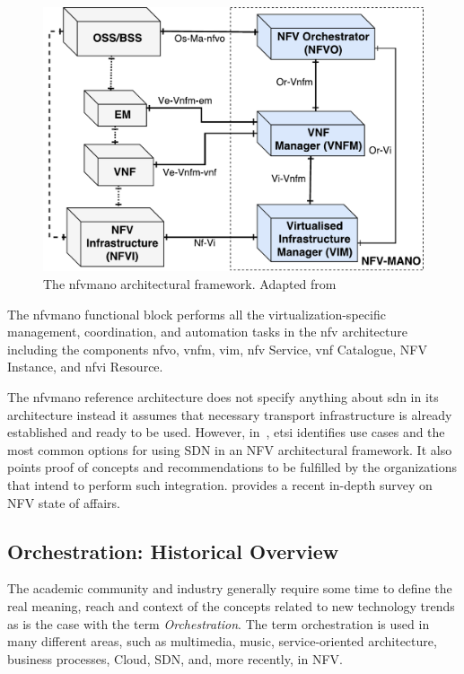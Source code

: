 \begin{figure}[t]
  \centering
  \includegraphics[scale=.4]{Figures/02_Background/MANO}
    \caption{The \gls{nfvmano} architectural framework. Adapted from \cite{ETSIIndustrySpecificationGroupISGNFV2014NetworkOptions}}
    \label{mano}
\end{figure}

The \gls{nfvmano} functional block performs all the virtualization-specific management, coordination, and automation tasks in the \gls{nfv} architecture including the components \gls{nfvo}, \gls{vnfm}, \gls{vim}, \gls{nfv} Service, \gls{vnf} Catalogue, NFV Instance, and \gls{nfvi} Resource. 

The \gls{nfvmano} reference architecture does not specify anything about \gls{sdn} in its architecture instead it assumes that necessary transport infrastructure is already established and ready to be used. However, in~\cite{ETSINetworkFramework}, \gls{etsi} identifies use cases and the most common options for using SDN in an NFV architectural framework. It also points proof of concepts and recommendations to be fulfilled by the organizations that intend to perform such integration.
\cite{nfv-survey18} provides a recent in-depth survey on NFV state of affairs. 

\subsection{Orchestration: Historical Overview}

The academic community and industry generally require some time to define the real meaning, reach and context of the concepts related to new technology trends as is the case with the term \textit{Orchestration}. 
The term orchestration is used in many different areas, such as multimedia, music, service-oriented architecture, business processes, Cloud, SDN, and, more recently, in NFV.

